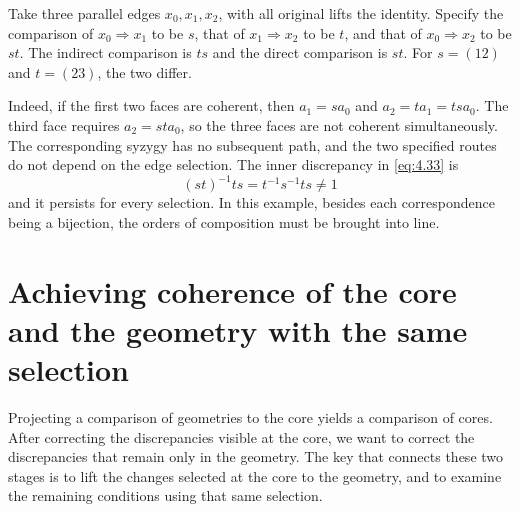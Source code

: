 \begin{example}\label{ex:4.29}

Take three parallel edges $x_0,x_1,x_2$, with all original lifts the identity.
Specify the comparison of $x_0\Rightarrow x_1$ to be $s$,
that of $x_1\Rightarrow x_2$ to be $t$, and
that of $x_0\Rightarrow x_2$ to be $st$.
The indirect comparison is $ts$ and the direct comparison is $st$.
For $s=(12)$ and $t=(23)$, the two differ.

Indeed, if the first two faces are coherent, then
$a_1=sa_0$ and $a_2=ta_1=tsa_0$.
The third face requires $a_2=sta_0$, so the three faces are not coherent simultaneously.
The corresponding syzygy has no subsequent path, and the two specified routes do not
depend on the edge selection.
The inner discrepancy in \eqref{eq:4.33} is
\begin{equation*}
(st)^{-1}ts=t^{-1}s^{-1}ts\ne1
\tag{4.35}\label{eq:4.35}
\end{equation*}
and it persists for every selection.
In this example, besides each correspondence being a bijection, the orders of composition
must be brought into line.

\end{example}

\section{Achieving coherence of the core and the geometry with the same selection}\label{sec:4.9}

Projecting a comparison of geometries to the core yields a comparison of cores.
After correcting the discrepancies visible at the core, we want to correct the
discrepancies that remain only in the geometry.
The key that connects these two stages is to lift the changes selected at the core to the
geometry, and to examine the remaining conditions using that same selection.


